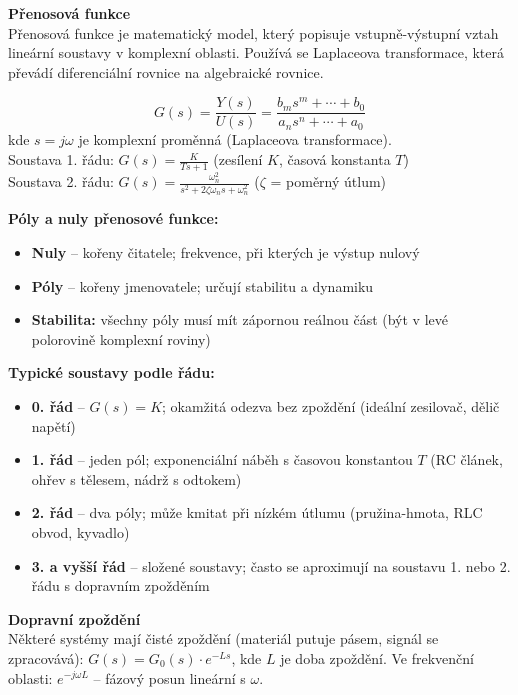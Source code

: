 \documentclass[a4paper,10pt]{article}
\begin{document}
\begin{vysvetlenibox}
\textbf{Přenosová funkce}\\
Přenosová funkce je matematický model, který popisuje vstupně-výstupní
vztah lineární soustavy v komplexní oblasti. Používá se Laplaceova
transformace, která převádí diferenciální rovnice na algebraické rovnice.

\begin{vzorcebox}
$$G(s) = \frac{Y(s)}{U(s)} = \frac{b_m s^m + \cdots + b_0}
{a_n s^n + \cdots + a_0}$$
kde $s = j\omega$ je komplexní proměnná (Laplaceova transformace).\\
Soustava 1. řádu: $G(s) = \frac{K}{Ts + 1}$ \quad
(zesílení $K$, časová konstanta $T$)\\
Soustava 2. řádu: $G(s) = \frac{\omega_n^2}{s^2 + 2\zeta\omega_n s + \omega_n^2}$
\quad ($\zeta$ = poměrný útlum)
\end{vzorcebox}

\textbf{Póly a nuly přenosové funkce:}
\begin{itemize}[noitemsep, leftmargin=1.4em, topsep=4pt]
    \item \textbf{Nuly} -- kořeny čitatele; frekvence, při kterých je výstup nulový
    \item \textbf{Póly} -- kořeny jmenovatele; určují stabilitu a dynamiku
    \item \textbf{Stabilita:} všechny póly musí mít zápornou reálnou část
          (být v levé polorovině komplexní roviny)
\end{itemize}

\textbf{Typické soustavy podle řádu:}
\begin{itemize}[noitemsep, leftmargin=1.4em, topsep=4pt]
    \item \textbf{0. řád} -- $G(s) = K$; okamžitá odezva bez zpoždění
          (ideální zesilovač, dělič napětí)
    \item \textbf{1. řád} -- jeden pól; exponenciální náběh s časovou konstantou $T$
          (RC článek, ohřev s tělesem, nádrž s odtokem)
    \item \textbf{2. řád} -- dva póly; může kmitat při nízkém útlumu
          (pružina-hmota, RLC obvod, kyvadlo)
    \item \textbf{3. a vyšší řád} -- složené soustavy; často se aproximují
          na soustavu 1. nebo 2. řádu s dopravním zpožděním
\end{itemize}

\textbf{Dopravní zpoždění}\\
Některé systémy mají čisté zpoždění (materiál putuje pásem, signál se
zpracovává): $G(s) = G_0(s) \cdot e^{-Ls}$, kde $L$ je doba zpoždění.
Ve frekvenční oblasti: $e^{-j\omega L}$ -- fázový posun lineární s $\omega$.


\end{vysvetlenibox}
\end{document}

